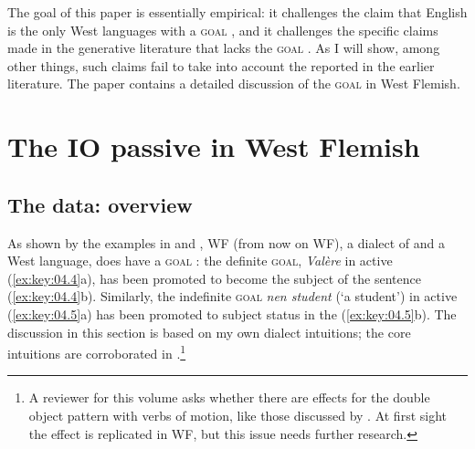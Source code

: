 \documentclass[output=paper]{langsci/langscibook}
\begin{document}
\ea\label{ex:key:04.3}  \parencite[10]{Aleetal2014}
    \z
\z

The goal of this paper is essentially empirical: it challenges the claim that
English is the only West  languages with a \textsc{goal} , and
it challenges the specific claims made in the generative literature
\parencite{BroekhuisCornips2004,BroekhuisCornips2012} that  lacks the
\textsc{goal} . As I will show, among other things, such claims fail to
take into account the  reported in the earlier literature. The
paper contains a detailed discussion of the \textsc{goal}  in West
Flemish.

\section{The IO passive in West Flemish}\label{sec:key:04.2}

\subsection{The data: overview}\label{sec:key:04.2.1} %

As shown by the examples in  and ,
\glsdesc{WF} (from now on \gls{WF}), a dialect of 
and a West  language, does have a \textsc{goal} : the
definite \textsc{goal}, \emph{Valère} in active (\ref{ex:key:04.4}a), has been
promoted to become the subject of the  sentence (\ref{ex:key:04.4}b).
Similarly, the indefinite \textsc{goal} \emph{nen student} (‘a student’) in
active (\ref{ex:key:04.5}a) has been promoted to subject status in the 
(\ref{ex:key:04.5}b). The discussion in this section is based on my own dialect
intuitions; the core intuitions are corroborated in
\citet{Dhaenens2014}.\footnote{A reviewer for this volume asks whether there
    are  effects for the double object pattern with verbs of motion,
like those discussed by \citet{Haddican2010}. At first sight the effect is
replicated in \gls{WF}, but this issue needs further research.}
\end{document}
